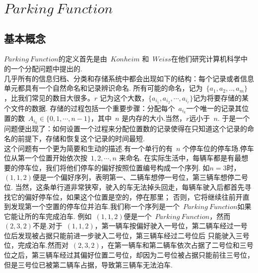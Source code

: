 \documentclass[a4paper,11pt]{article}
\begin{document}
\section{$Parking\ Function$}

\subsection{基本概念}

$Parking\ Function$的定义首先是由~$Konheim$ 和~$Weiss$在他们研究计算机科学中的一个分配问题中提出的.\\
\indent 几乎所有的信息归档、分类和存储系统中都会出现如下的结构：每个记录或者信息单元都具有一个自然命名和记录辨识命名.
所有可能的命名，记为~$\{a_1,a_2,..,a_m\}$，比我们常见的数目大很多。$r$ 记为这个大数，$\{a_{i_1},a_{i_2},\cdots,a_{i_r}\}$记为将要存储的某个文件的数据.
存储的过程包括一个重要步骤：分配每个~$a_{i_k}$一个唯一的记录其位置的数~$A_{i_k}\in\{0,1,\cdots,n-1\}$，其中~$n$ 是内存的大小.当然，$r$远小于~$n$.
于是一个问题便出现了：如何设置一个过程来分配位置数的记录使得在只知道这个记录的命名的前提下，存储和恢复这个记录的时间最短.\\
\indent 这个问题有一个更为简要和生动的描述.有一个单行的有~$n$ 个停车位的停车场.停车位从第一个位置开始依次按~$1,2,\cdots,n$ 来命名.
在实际生活中，每辆车都是有最想要的停车位，我们将他们停车的偏好按照位置编号构成一个序列.
如$n=3$时，$(1,1,2)$便是一个偏好序列，表明第一、二辆车想停一号位，第三辆车想停二号位.
当然，这条单行道非常狭窄，驶入的车无法掉头回走，每辆车驶入后都首先寻找它的偏好停车位，如果这个位置是空的，停在那里；
否则，它将继续往前开直到发现第一个空置的停车位并泊车.我们称一个序列是一个~$Parking\ Function$如果它能让所的车完成泊车.
例如~$(1,1,2)$便是一个~$Parking\ Function$，然而~$(2,3,2)$不是.对于~$(1,1,2)$，第一辆车按偏好驶入一号位，第二辆车经过一号位后发现被占据只能前进一步驶入二号位，第三辆车经过二号位后 只能驶入三号位，完成泊车.然而对~$(2,3,2)$，在第一辆车和第二辆车依次占据了二号位和三号位之后，第三辆车经过其偏好位置二号位，却因为二号位被占据只能前往三号位，
但是三号位已被第二辆车占据，导致第三辆车无法泊车.\\
\end{document}
